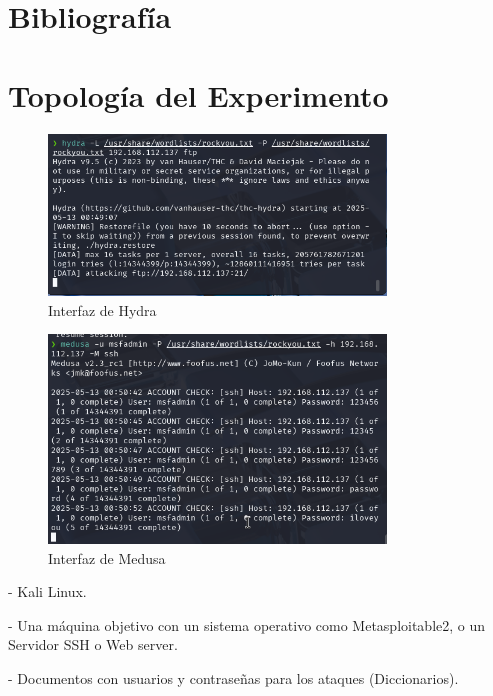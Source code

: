 \documentclass[12pt,a4paper]{article}
\begin{document}
\section*{Bibliografía}

\section*{Topología del Experimento}

\begin{figure}[htbp]
    \centering
    \includegraphics[width=0.8\textwidth]{hydra.png}
    \caption{Interfaz de Hydra}
    \label{fig:hydra}
\end{figure}

\begin{figure}[htbp]
    \centering
    \includegraphics[width=0.8\textwidth]{medusa.png}
    \caption{Interfaz de Medusa}
    \label{fig:medusa}
\end{figure}

- Kali Linux.

    
- Una máquina objetivo con un sistema operativo como Metasploitable2, o un Servidor SSH o Web server.
    
- Documentos con usuarios y contraseñas para los ataques (Diccionarios).
    
\end{document}
